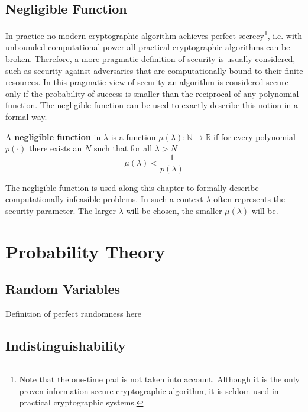 \subsection{Negligible Function}
In practice no modern cryptographic algorithm achieves perfect secrecy\footnote{Note that the one-time pad is not taken into account. Although it is the only proven information secure cryptographic algorithm, it is seldom used in practical cryptographic systems.}, i.e. with unbounded computational power all practical cryptographic algorithms can be broken. Therefore, a more pragmatic definition of security is usually considered, such as security against adversaries that are computationally bound to their finite resources. In this pragmatic view of security an algorithm is considered secure only if the probability of success is smaller than the reciprocal of any polynomial function. The negligible function can be used to exactly describe this notion in a formal way.

\begin{defn}
\label{def:negligible_function}
A \textbf{negligible function} in $\lambda$ is a function $\mu \left( \lambda \right): \mathbb{N} \rightarrow \mathbb{R}$ if for every polynomial $p \left( \cdot \right)$ there exists an $N$ such that for all $\lambda > N$~\cite{book:Goldreich97}
 \begin{equation*}
  \mu \left( \lambda \right) < \frac{1}{p\left( \lambda \right)} 
 \end{equation*}
\end{defn}

The negligible function is used along this chapter to formally describe computationally infeasible problems. In such a context $\lambda$ often represents the security parameter. The larger $\lambda$ will be chosen, the smaller $\mu \left( \lambda \right)$ will be.


\section{Probability Theory}

\subsection{Random Variables}
Definition of perfect randomness here
\subsection{Indistinguishability}

